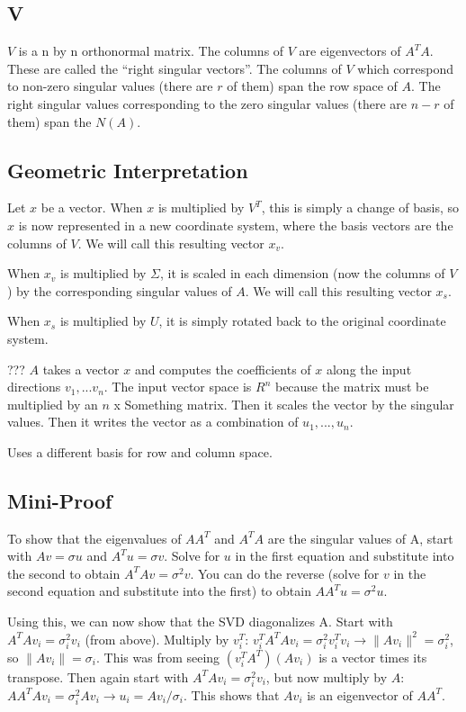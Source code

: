 \documentclass[12pt]{article}
\begin{document}
\begin{itemize}
\subsection{V}
$V$ is a n by n orthonormal matrix. The columns of $V$ are eigenvectors of $A^T A$. These are called the ``right singular vectors''. The columns of $V$ which correspond to non-zero singular values (there are $r$ of them) span the row space of $A$. The right singular values corresponding to the zero singular values (there are $n-r$ of them) span the $N(A)$. 

\subsection{Geometric Interpretation}
Let $x$ be a vector. When $x$ is multiplied by $V^T$, this is simply a change of basis, so $x$ is now represented in a new coordinate system, where the basis vectors are the columns of $V$. We will call this resulting vector $x_v$.

When $x_v$ is multiplied by $\Sigma$, it is scaled in each dimension (now the columns of $V$) by the corresponding singular values of $A$. We will call this resulting vector $x_s$.

When $x_s$ is multiplied by $U$, it is simply rotated back to the original coordinate system.

??? $A$ takes a vector $x$ and computes the coefficients of $x$ along the input directions $v_1,... v_n$. The input vector space is $R^n$ because the matrix must be multiplied by an $n$ x Something matrix. Then it scales the vector by the singular values. Then it writes the vector as a combination of $u_1, ... , u_n$.

Uses a different basis for row and column space.

\subsection{Mini-Proof}
To show that the eigenvalues of $AA^T$ and $A^TA$ are the singular values of A, start with $Av = \sigma u$ and $A^Tu=\sigma v$.  Solve for $u$ in the first equation and substitute into the second to obtain $A^TAv=\sigma^2 v$.  You can do the reverse (solve for $v$ in the second equation and substitute into the first) to obtain $AA^Tu=\sigma^2 u$.

Using this, we can now show that the SVD diagonalizes A.
Start with $A^TAv_i = \sigma_i^2 v_i$ (from above).
Multiply by $v_i^T$:
$v_i^T A^T A v_i = \sigma_i^2 v_i^T v_i \rightarrow \|Av_i\|^2 = \sigma_i^2$, so $\|Av_i\| = \sigma_i$. This was from seeing $(v_i ^T A^T)(A v_i)$ is a vector times its transpose.
Then again start with $A^TAv_i = \sigma_i^2 v_i$, but now multiply by $A$:
$A A^T A v_i = \sigma_i^2 A v_i \rightarrow u_i = A v_i / \sigma_i$. This shows that $A v_i$ is an eigenvector of $AA^T$.


\end{itemize}
\end{document}

